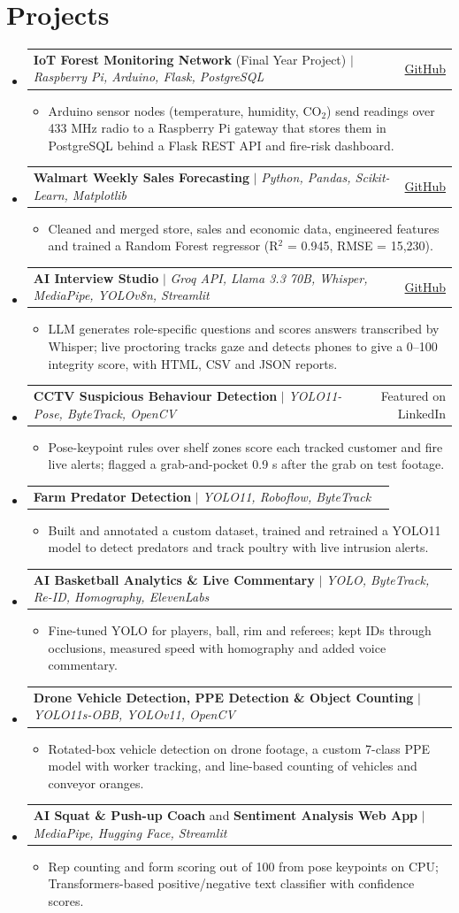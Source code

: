 \documentclass[a4paper,10pt]{article}
\makeatletter
\newcommand{\resumeItem}[1]{\item\small{#1 \vspace{-2pt}}}
\newcommand{\resumeProjectHeading}[2]{
    \item
    \begin{tabular*}{\textwidth}{l@{\extracolsep{\fill}}r}
      \small#1 & \small #2 \\
    \end{tabular*}\vspace{-6pt}
}
\newcommand{\resumeSubHeadingListStart}{\begin{itemize}[leftmargin=0.0in, label={}]}
\newcommand{\resumeSubHeadingListEnd}{\end{itemize}}
\newcommand{\resumeItemListStart}{\begin{itemize}[leftmargin=0.18in, itemsep=0pt]}
\newcommand{\resumeItemListEnd}{\end{itemize}\vspace{-4pt}}
\makeatother
\begin{document}
\section{Projects}
\resumeSubHeadingListStart
  \resumeProjectHeading{\textbf{IoT Forest Monitoring Network} (Final Year Project) $|$ \emph{Raspberry Pi, Arduino, Flask, PostgreSQL}}{\href{https://github.com/nimrafaryal/iot-based-forest-network}{GitHub}}
    \resumeItemListStart
      \resumeItem{Arduino sensor nodes (temperature, humidity, CO$_2$) send readings over 433 MHz radio to a Raspberry Pi gateway that stores them in PostgreSQL behind a Flask REST API and fire-risk dashboard.}
    \resumeItemListEnd
  \resumeProjectHeading{\textbf{Walmart Weekly Sales Forecasting} $|$ \emph{Python, Pandas, Scikit-Learn, Matplotlib}}{\href{https://github.com/nimrafaryal/walmart-weekly-sales-forecasting}{GitHub}}
    \resumeItemListStart
      \resumeItem{Cleaned and merged store, sales and economic data, engineered features and trained a Random Forest regressor (R$^2$ = 0.945, RMSE = 15,230).}
    \resumeItemListEnd
  \resumeProjectHeading{\textbf{AI Interview Studio} $|$ \emph{Groq API, Llama 3.3 70B, Whisper, MediaPipe, YOLOv8n, Streamlit}}{\href{https://github.com/nimrafaryal/ai-interview-studio}{GitHub}}
    \resumeItemListStart
      \resumeItem{LLM generates role-specific questions and scores answers transcribed by Whisper; live proctoring tracks gaze and detects phones to give a 0--100 integrity score, with HTML, CSV and JSON reports.}
    \resumeItemListEnd
  \resumeProjectHeading{\textbf{CCTV Suspicious Behaviour Detection} $|$ \emph{YOLO11-Pose, ByteTrack, OpenCV}}{Featured on LinkedIn}
    \resumeItemListStart
      \resumeItem{Pose-keypoint rules over shelf zones score each tracked customer and fire live alerts; flagged a grab-and-pocket 0.9 s after the grab on test footage.}
    \resumeItemListEnd
  \resumeProjectHeading{\textbf{Farm Predator Detection} $|$ \emph{YOLO11, Roboflow, ByteTrack}}{}
    \resumeItemListStart
      \resumeItem{Built and annotated a custom dataset, trained and retrained a YOLO11 model to detect predators and track poultry with live intrusion alerts.}
    \resumeItemListEnd
  \resumeProjectHeading{\textbf{AI Basketball Analytics \& Live Commentary} $|$ \emph{YOLO, ByteTrack, Re-ID, Homography, ElevenLabs}}{}
    \resumeItemListStart
      \resumeItem{Fine-tuned YOLO for players, ball, rim and referees; kept IDs through occlusions, measured speed with homography and added voice commentary.}
    \resumeItemListEnd
  \resumeProjectHeading{\textbf{Drone Vehicle Detection, PPE Detection \& Object Counting} $|$ \emph{YOLO11s-OBB, YOLOv11, OpenCV}}{}
    \resumeItemListStart
      \resumeItem{Rotated-box vehicle detection on drone footage, a custom 7-class PPE model with worker tracking, and line-based counting of vehicles and conveyor oranges.}
    \resumeItemListEnd
  \resumeProjectHeading{\textbf{AI Squat \& Push-up Coach} and \textbf{Sentiment Analysis Web App} $|$ \emph{MediaPipe, Hugging Face, Streamlit}}{}
    \resumeItemListStart
      \resumeItem{Rep counting and form scoring out of 100 from pose keypoints on CPU; Transformers-based positive/negative text classifier with confidence scores.}
    \resumeItemListEnd
\resumeSubHeadingListEnd
\end{document}
